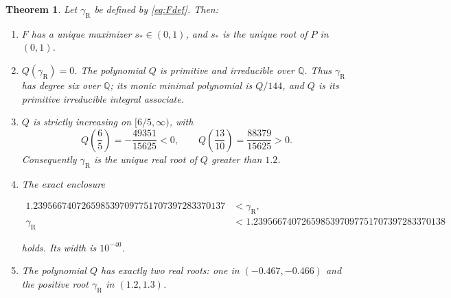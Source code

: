\documentclass[11pt]{article}
\newtheorem{theorem}{Theorem}
\theoremstyle{remark}
\newcommand{\gR}{\gamma_{\mathrm R}}
\begin{document}
\begin{theorem}\label{thm:main}
Let \(\gR\) be defined by \eqref{eq:Fdef}. Then:
\begin{enumerate}[label=(\roman*)]
\item \(F\) has a unique maximizer \(s_*\in(0,1)\), and \(s_*\) is the unique root of \(P\) in \((0,1)\).
\item \(Q(\gR)=0\). The polynomial \(Q\) is primitive and irreducible over \(\mathbb Q\). Thus \(\gR\) has degree six over \(\mathbb Q\); its monic minimal polynomial is \(Q/144\), and \(Q\) is its primitive irreducible integral associate.
\item \(Q\) is strictly increasing on \([6/5,\infty)\), with
\[
Q\!\left(\frac65\right)=-\frac{49351}{15625}<0,
\qquad
Q\!\left(\frac{13}{10}\right)=\frac{88379}{15625}>0.
\]
Consequently \(\gR\) is the unique real root of \(Q\) greater than \(1.2\).
\item The exact enclosure
\begin{center}
\small
$\begin{aligned}
1.2395667407265985397097751707397283370137&<\gR,\\
\gR&<1.2395667407265985397097751707397283370138
\end{aligned}$
\end{center}
holds. Its width is \(10^{-40}\).
\item The polynomial \(Q\) has exactly two real roots: one in \((-0.467,-0.466)\) and the positive root \(\gR\) in \((1.2,1.3)\).
\end{enumerate}
\end{theorem}
\end{document}
